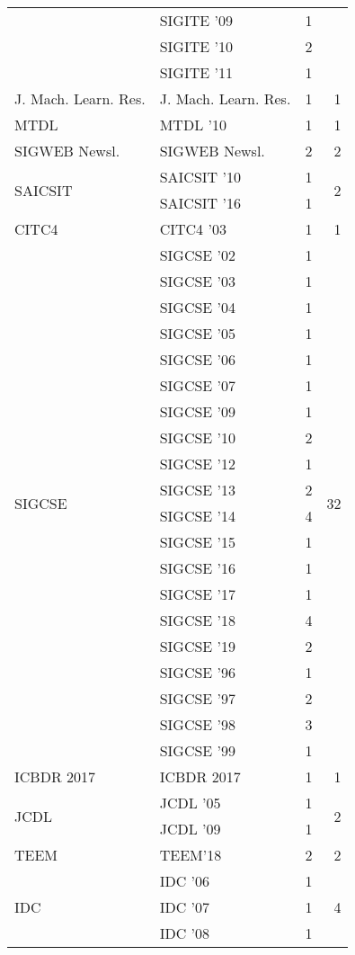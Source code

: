\begin{table*}[t]
\begin{tabular}{llrr}
& SIGITE '09 & 1 &\\
& SIGITE '10 & 2 &\\
& SIGITE '11 & 1 &\\
\multirow{1}{*}{J. Mach. Learn. Res.} & J. Mach. Learn. Res. & 1 & \multirow{1}{*}{1}\\
\multirow{1}{*}{MTDL } & MTDL '10 & 1 & \multirow{1}{*}{1}\\
\multirow{1}{*}{SIGWEB Newsl.} & SIGWEB Newsl. & 2 & \multirow{1}{*}{2}\\
\multirow{2}{*}{SAICSIT } & SAICSIT '10 & 1 & \multirow{2}{*}{2}\\
& SAICSIT '16 & 1 &\\
\multirow{1}{*}{CITC4 } & CITC4 '03 & 1 & \multirow{1}{*}{1}\\
\multirow{20}{*}{SIGCSE } & SIGCSE '02 & 1 & \multirow{20}{*}{32}\\
& SIGCSE '03 & 1 &\\
& SIGCSE '04 & 1 &\\
& SIGCSE '05 & 1 &\\
& SIGCSE '06 & 1 &\\
& SIGCSE '07 & 1 &\\
& SIGCSE '09 & 1 &\\
& SIGCSE '10 & 2 &\\
& SIGCSE '12 & 1 &\\
& SIGCSE '13 & 2 &\\
& SIGCSE '14 & 4 &\\
& SIGCSE '15 & 1 &\\
& SIGCSE '16 & 1 &\\
& SIGCSE '17 & 1 &\\
& SIGCSE '18 & 4 &\\
& SIGCSE '19 & 2 &\\
& SIGCSE '96 & 1 &\\
& SIGCSE '97 & 2 &\\
& SIGCSE '98 & 3 &\\
& SIGCSE '99 & 1 &\\
\multirow{1}{*}{ICBDR 2017} & ICBDR 2017 & 1 & \multirow{1}{*}{1}\\
\multirow{2}{*}{JCDL } & JCDL '05 & 1 & \multirow{2}{*}{2}\\
& JCDL '09 & 1 &\\
\multirow{1}{*}{TEEM} & TEEM'18 & 2 & \multirow{1}{*}{2}\\
\multirow{4}{*}{IDC } & IDC '06 & 1 & \multirow{4}{*}{4}\\
& IDC '07 & 1 &\\
& IDC '08 & 1 &\\

\end{tabular}
\end{table*}
